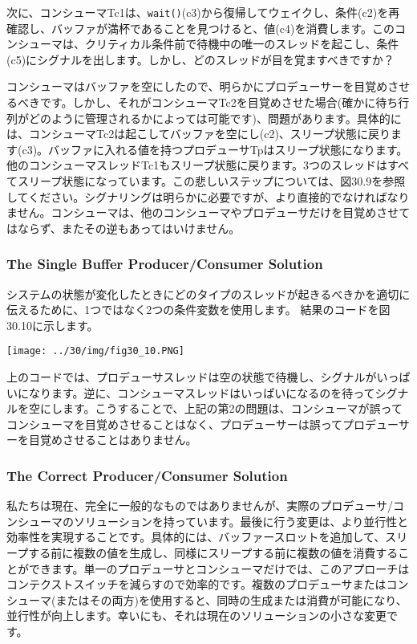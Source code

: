 次に、コンシューマTc1は、\texttt{wait()}(c3)から復帰してウェイクし、条件(c2)を再確認し、バッファが満杯であることを見つけると、値(c4)を消費します。このコンシューマは、クリティカル条件前で待機中の唯一のスレッドを起こし、条件(c5)にシグナルを出します。しかし、どのスレッドが目を覚ますべきですか？

コンシューマはバッファを空にしたので、明らかにプロデューサーを目覚めさせるべきです。しかし、それがコンシューマTc2を目覚めさせた場合(確かに待ち行列がどのように管理されるかによっては可能です)、問題があります。具体的には、コンシューマTc2は起こしてバッファを空にし(c2)、スリープ状態に戻ります(c3)。バッファに入れる値を持つプロデューサTpはスリープ状態になります。他のコンシューマスレッドTc1もスリープ状態に戻ります。3つのスレッドはすべてスリープ状態になっています。この悲しいステップについては、図30.9を参照してください。シグナリングは明らかに必要ですが、より直接的でなければなりません。コンシューマは、他のコンシューマやプロデューサだけを目覚めさせてはならず、またその逆もあってはいけません。

\hypertarget{the-single-buffer-producerconsumer-solution}{%
\subsubsection*{The Single Buffer Producer/Consumer
Solution}\label{the-single-buffer-producerconsumer-solution}}

システムの状態が変化したときにどのタイプのスレッドが起きるべきかを適切に伝えるために、1つではなく2つの条件変数を使用します。
結果のコードを図30.10に示します。

\texttt{[image: ../30/img/fig30\_10.PNG]}

上のコードでは、プロデューサスレッドは空の状態で待機し、シグナルがいっぱいになります。逆に、コンシューマスレッドはいっぱいになるのを待ってシグナルを空にします。こうすることで、上記の第2の問題は、コンシューマが誤ってコンシューマを目覚めさせることはなく、プロデューサーは誤ってプロデューサーを目覚めさせることはありません。

\hypertarget{the-correct-producerconsumer-solution}{%
\subsubsection*{The Correct Producer/Consumer
Solution}\label{the-correct-producerconsumer-solution}}

私たちは現在、完全に一般的なものではありませんが、実際のプロデューサ/コンシューマのソリューションを持っています。最後に行う変更は、より並行性と効率性を実現することです。具体的には、バッファースロットを追加して、スリープする前に複数の値を生成し、同様にスリープする前に複数の値を消費することができます。単一のプロデューサとコンシューマだけでは、このアプローチはコンテクストスイッチを減らすので効率的です。複数のプロデューサまたはコンシューマ(またはその両方)を使用すると、同時の生成または消費が可能になり、並行性が向上します。幸いにも、それは現在のソリューションの小さな変更です。

